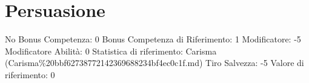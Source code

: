 \section{Persuasione}\label{persuasione}

\begin{description}
\tightlist
\item[Tags: ABI]
No Bonus Competenza: 0 Bonus Competenza di Riferimento: 1 Modificatore:
-5 Modificatore Abilità: 0 Statistica di riferimento: Carisma
(Carisma\%20bbf62738772142369688234bf4ec0c1f.md) Tiro Salvezza: -5
Valore di riferimento: 0
\end{description}
